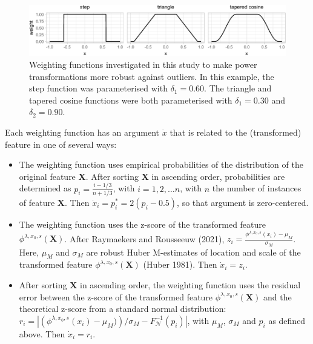 \documentclass[
  a4paper,
]{article}
\begin{document}
\begin{figure}

{\centering \includegraphics{manuscript_files/figure-latex/weighting-functions-1} 

}

\caption{Weighting functions investigated in this study to make power transformations more robust against outliers. In this example, the step function was parameterised with $\delta_1 = 0.60$. The triangle and tapered cosine functions were both parameterised with $\delta_1 = 0.30$ and $\delta_2 = 0.90$.}\label{fig:weighting-functions}
\end{figure}

Each weighting function has an argument \(\dot{x}\) that is related to
the (transformed) feature in one of several ways:

\begin{itemize}
\item
  The weighting function uses empirical probabilities of the
  distribution of the original feature \(\mathbf{X}\). After sorting
  \(\mathbf{X}\) in ascending order, probabilities are determined as
  \(p_i = \frac{i - 1/3}{n + 1/3}\), with \(i = 1, 2, \ldots n\), with
  \(n\) the number of instances of feature \(\mathbf{X}\). Then
  \(\dot{x}_i = p^{*}_i=2 \left( p_i - 0.5\right)\), so that argument is
  zero-centered.
\item
  The weighting function uses the z-score of the transformed feature
  \(\phi^{\lambda, x_0, s} (\mathbf{X})\). After Raymaekers and
  Rousseeuw (2021),
  \(z_i = \frac{\phi^{\lambda, x_0, s}(x_i) - \mu_M}{\sigma_M}\). Here,
  \(\mu_M\) and \(\sigma_M\) are robust Huber M-estimates of location
  and scale of the transformed feature
  \(\phi^{\lambda, x_0, s} (\mathbf{X})\) (Huber 1981). Then
  \(\dot{x}_i = z_i\).
\item
  After sorting \(\mathbf{X}\) in ascending order, the weighting
  function uses the residual error between the z-score of the
  transformed feature \(\phi^{\lambda, x_0, s} (\mathbf{X})\) and the
  theoretical z-score from a standard normal distribution:
  \(r_i =\left| \left( \phi^{\lambda, x_0, s}(x_i) - \mu_M)\right) / \sigma_M - F^{-1}_{\mathcal{N}}(p_i) \right|\),
  with \(\mu_M\), \(\sigma_M\) and \(p_i\) as defined above. Then
  \(\dot{x}_i = r_i\).
\end{itemize}
\end{document}
